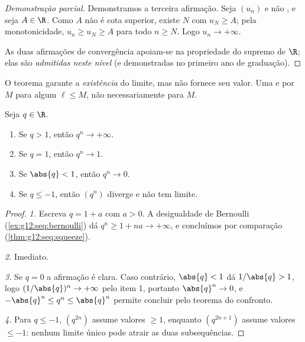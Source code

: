 \begin{proof}[Demonstração parcial]
Demonstramos a terceira afirmação. Seja $(u_n)$  e não , e seja $A \in \R$. Como $A$ não é cota superior, existe $N$
com $u_N \geq A$; pela monotonicidade, $u_n \geq u_N \geq A$ para todo
$n \geq N$. Logo $u_n \to +\infty$.

As duas afirmações de convergência apoiam-se na propriedade do supremo de
$\R$; elas são \emph{admitidas neste nível} (e demonstradas no primeiro
ano de graduação).
\end{proof}

\begin{remark}
O teorema garante a \emph{existência} do limite, mas não fornece seu
valor. Uma   e  por $M$ 
para algum $\ell \leq M$, não necessariamente para $M$.
\end{remark}

\begin{theorem}\label{thm:g12:seq:geometric}
Seja $q \in \R$.
\begin{enumerate}
  \item Se $q > 1$, então $q^n \to +\infty$.
  \item Se $q = 1$, então $q^n \to 1$.
  \item Se $\abs{q} < 1$, então $q^n \to 0$.
  \item Se $q \leq -1$, então $(q^n)$ diverge e não tem limite.
\end{enumerate}
\end{theorem}

\begin{proof}
\emph{1.} Escreva $q = 1 + a$ com $a > 0$. A desigualdade de Bernoulli
(\cref{ex:g12:seq:bernoulli}) dá $q^n \geq 1 + na \to +\infty$, e
concluímos por comparação (\cref{thm:g12:seq:squeeze}).

\emph{2.} Imediato.

\emph{3.} Se $q = 0$ a afirmação é clara. Caso contrário,
$\abs{q} < 1$ dá $1/\abs{q} > 1$, logo $(1/\abs{q})^n \to +\infty$ pelo
item 1, portanto $\abs{q}^n \to 0$, e
$-\abs{q}^n \leq q^n \leq \abs{q}^n$ permite concluir pelo teorema do
confronto.

\emph{4.} Para $q \leq -1$, $(q^{2n})$ assume valores $\geq 1$, enquanto
$(q^{2n+1})$ assume valores $\leq -1$: nenhum limite único pode atrair as
duas subsequências.
\end{proof}

